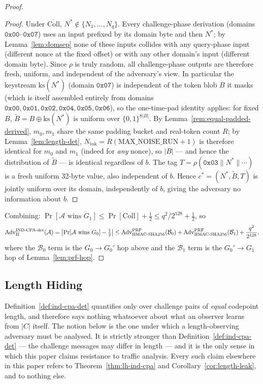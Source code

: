 \documentclass[11pt,a4paper]{article}
\begin{document}
\begin{proof}
\begin{proof}
Under $\overline{\mathrm{Coll}}$, $N^*\notin\{N_1,\ldots,N_q\}$. Every
challenge-phase derivation (domains $\texttt{0x00}$–$\texttt{0x07}$) uses
an input prefixed by its domain byte and then $N^*$; by
Lemma~\ref{lem:domsep} none of these inputs collides with any query-phase
input (different nonce at the fixed offset) or with any other domain's
input (different domain byte). Since $\rho$ is truly random, all
challenge-phase outputs are therefore fresh, uniform, and independent of
the adversary's view. In particular the keystream
$\mathrm{ks}(N^*)$ (domain $\texttt{0x07}$) is independent of the token
blob $B$ it masks (which is itself assembled entirely from domains
$\texttt{0x00},\texttt{0x01},\texttt{0x02},\texttt{0x04},\texttt{0x05},\texttt{0x06}$),
so the one-time-pad identity applies: for fixed $B$,
$\widetilde{B}=B\oplus\mathrm{ks}(N^*)$ is uniform over
$\{0,1\}^{8|B|}$. By Lemma~\ref{rem:equal-padded-derived}, $m_0,m_1$ share
the same padding bucket and real-token count $R$; by
Lemma~\ref{lem:length-det}, $N_{\mathrm{tok}}=R(\mathrm{MAX\_NOISE\_RUN}+1)$
is therefore identical for $m_0$ and $m_1$ (indeed for \emph{any} nonce),
so $|B|$ — and hence the distribution of $\widetilde{B}$ — is identical
regardless of $b$. The tag $T=\rho(\texttt{0x03}\|N^*\|\cdots)$ is a fresh
uniform 32-byte value, also independent of $b$. Hence
$c^*=(N^*,\widetilde{B},T)$ is jointly uniform over its domain,
independently of $b$, giving the adversary no information about $b$.
\end{proof}

Combining: $\Pr[\mathcal{A}\text{ wins }G_1]\le\Pr[\mathrm{Coll}]+\tfrac12\le q^2/2^{128}+\tfrac12$,
so
\[
  \mathrm{Adv}^{\mathrm{IND\text{-}CPA\text{-}det}}_{\Pi}(\mathcal{A})
  = \bigl|\Pr[\mathcal{A}\text{ wins }G_0]-\tfrac12\bigr|
  \le \mathrm{Adv}^{\mathrm{PRF}}_{\mathrm{HMAC\text{-}SHA256}}(\mathcal{B}_0)
    + \mathrm{Adv}^{\mathrm{PRF}}_{\mathrm{HMAC\text{-}SHA256}}(\mathcal{B}_1)
    + \frac{q^2}{2^{128}}, \qedhere
\]
where the $\mathcal{B}_0$ term is the $G_0\to G_0'$ hop above and the
$\mathcal{B}_1$ term is the $G_0'\to G_1$ hop of
Lemma~\ref{lem:prf-hop}.
\end{proof}

\subsection{Length Hiding}
\label{sec:length-hiding}

Definition~\ref{def:ind-cpa-det} quantifies only over challenge pairs of
\emph{equal} codepoint length, and therefore says nothing whatsoever about
what an observer learns from $|C|$ itself. The notion below is the one
under which a length-observing adversary must be analysed. It is strictly
stronger than Definition~\ref{def:ind-cpa-det} — the challenge messages may
differ in length — and it is the only sense in which this paper claims
resistance to traffic analysis. Every such claim elsewhere in this paper
refers to Theorem~\ref{thm:lh-ind-cpa} and
Corollary~\ref{cor:length-leak}, and to nothing else.
\end{document}
